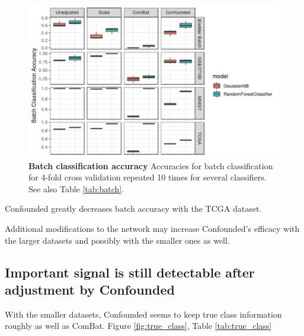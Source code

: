 \documentclass[notitlepage]{article}
\begin{document}
\begin{figure}
	\centering
	\includegraphics[width=4.5in]{figures/rough/batch_accuracy}
	\caption{\textbf{Batch classification accuracy} Accuracies for batch classification for 4-fold cross validation repeated 10 times for several classifiers.
	See also Table \ref{tab:batch}.}
	\label{fig:batch}
\end{figure}
\begin{table}
	\centering
	\caption{\textbf{Batch classification accuracy} for several datasets and adjusters.
	The ideal batch adjuster would completely remove all signal due to batch and would therefore \textit{decrease} batch classification accuracy to around the baseline for all classifiers.
	See also Figure \ref{fig:batch}.}
	\label{tab:batch}
\end{table}

Confounded greatly decreases batch accuracy with the TCGA dataset.

Additional modifications to the network may increase Confounded's efficacy with the larger datasets and possibly with the smaller ones as well.

\subsection{Important signal is still detectable after adjustment by Confounded}

With the smaller datasets, Confounded seems to keep true class information roughly as well as ComBat.
Figure \ref{fig:true_class}, Table \ref{tab:true_class}
\end{document}

